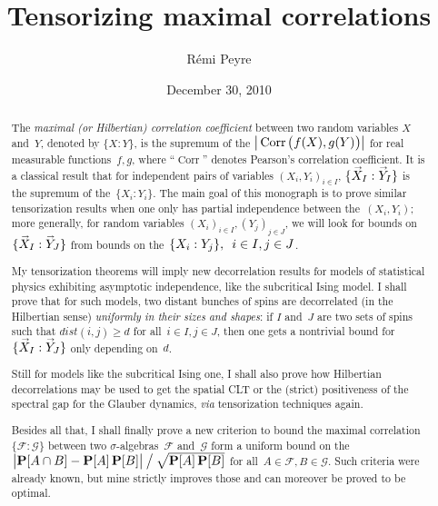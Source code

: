 \documentclass[a4paper,twoside,12pt]{report}
\author{R\'emi Peyre}
\title{Tensorizing maximal correlations}
\date{December 30, 2010}
\makeatletter
\theoremstyle{definition}
\theoremstyle{plain}
\theoremstyle{remark}
\newcommand\mbf{\mathbf}
\newcommand\mcal{\mathcal}
\newcommand\ab{\allowbreak}
\renewcommand\geq{\geqslant}
\renewcommand\Pr{\mathop{\smash{\mbf{P}}}\nolimits}
\renewcommand\[{\begin{equation}}
\renewcommand\]{\end{equation}}
\def\CM@fonts#1{\begingroup\fontfamily{cmr}\selectfont#1\endgroup}
\def\vec@low  {\CM@fonts{\relsize{+0}\raisebox{-0.0ex}{$\rightarrow$}}}
\renewcommand\vec  [1]{\accentset{\smash{\text{\vec@low  }}\rule{0pt}{.3ex}}{#1}}
\let\enskip@TeX=\enskip
\renewcommand\enskip{\penalty-0\enskip@TeX\relax}
\renewcommand\big[1]{\text{\relsize{+1}\raisebox{-.09ex}{$#1$}}}
\let\figurename@TeX=\figurename%
\renewcommand\figurename{\small\figurename@TeX}%
\newcommand\1[1]{\mbf{1}_{\text{\relsize{+1}$#1$}}} %
\newcommand\dist{\mathit{dist}}
\DeclareMathOperator\Corr{Corr}
\makeatother
\begin{document}


\maketitle

\begin{abstract}
The \emph{maximal \emph{(or \emph{Hilbertian})} correlation coefficient} between two random variables $X$ and~$Y$, denoted by ${\{X:Y\}}$, is the supremum of the $\big|\Corr\big(f(X),g(Y)\big)\big|$ for real measurable functions~$f,g$, where ``$\Corr$'' denotes Pearson's correlation coefficient.
%
It is a classical result that for independent pairs of variables $(X_i,Y_i)_{i\in I}$, ${\{\vec{X}_I : \vec{Y}_I\}}$ is the supremum of the~${\{X_i:Y_i\}}$. The main goal of this monograph is to prove similar tensorization results when one only has partial independence between the~$(X_i,Y_i)$; more generally, for random variables $(X_i)_{i\in I}, \ab (Y_j)_{j\in J}$, we will look for bounds on~${\{\vec{X}_I:\vec{Y}_J\}}$ from bounds on the~${\{X_i:Y_j\}}, \enskip i\in I, \ab j\in J$.

My tensorization theorems will imply new decorrelation results for models of statistical physics exhibiting asymptotic independence, like the subcritical Ising model. I shall prove that for such models, two distant bunches of spins are decorrelated (in the Hilbertian sense) \emph{uniformly in their sizes and shapes}: if $I$ and~$J$ are two sets of spins such that $\dist(i,j) \geq d$ for all~$i\in I, \ab j\in J$, then one gets a nontrivial bound for~${\{\vec{X}_I:\vec{Y}_J\}}$ only depending on~$d$.

Still for models like the subcritical Ising one, I shall also prove how Hilbertian decorrelations may be used to get the spatial CLT or the (strict) positiveness of the spectral gap for the Glauber dynamics, \emph{via} tensorization techniques again.

Besides all that, I shall finally prove a new criterion to bound the maximal correlation~${\{\mcal{F}:\mcal{G}\}}$ between two $\sigma$-algebras~$\mcal{F}$ and~$\mcal{G}$ form a uniform bound on the $\big|{\Pr[A\cap B]}-{\Pr[A]\Pr[B]}\big| \mathbin{\big/} \sqrt{\Pr[A]\Pr[B]}$ for all~$A\in\mcal{F}, \ab B\in\mcal{G}$. Such criteria were already known, but mine strictly improves those and can moreover be proved to be optimal.
\end{abstract}



\setcounter{tocdepth}{1}
\tableofcontents









\end{document}

